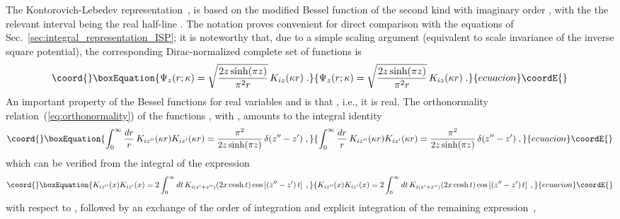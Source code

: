 \documentclass[a4paper,preprint,draft,showpacs,amsmath,amsfonts,amssymb,aps,prd]{revtex4}%
\begin{document}
The Kontorovich-Lebedev representation~\cite{kontorovich},
is based on the modified Bessel function
of the second kind with imaginary order
\coordHE{}, with the 
the relevant interval being the real half-line
\myHighlight{${\mathcal I} = [0,\infty)$}\coordHE{}.
The notation
\coordHE{}
proves convenient  for direct comparison with the equations of 
Sec.~\ref{sec:integral_representation_ISP}; it is noteworthy that, due to a simple
scaling argument (equivalent to scale
invariance of the inverse square potential), 
the corresponding Dirac-normalized complete set of functions
is
\begin{equation}\coord{}\boxEquation{
\Psi_{z} (r;\kappa)
=
\sqrt{  \frac{ 2 z \sinh ( \pi z )  }{ \pi^{2} r }  }
\,
K_{iz} (\kappa r) 
\;   .
}{
\Psi_{z} (r;\kappa)
=
\sqrt{  \frac{ 2 z \sinh ( \pi z )  }{ \pi^{2} r }  }
\,
K_{iz} (\kappa r) 
\;   .
}{ecuacion}\coordE{}\end{equation}
An important property of the Bessel functions \coordHE{} for real variables
\coordHE{} and \coordHE{} is that
\coordHE{},
i.e., it is real.
The orthonormality relation~(\ref{eq:orthonormality})
of the functions \coordHE{}, with \myHighlight{${\mathcal J} =[0,\infty)$}\coordHE{},
amounts to the integral identity
\begin{equation}\coord{}\boxEquation{
\int_{0}^{\infty}
\frac{dr}{r}
\,
K_{iz''} (\kappa r) 
K_{iz'} (\kappa r) 
=
\frac{ \pi^{2}  }{ 2 z \sinh ( \pi z )  }
\,
\delta (z''-z')
\;  ,
\label{eq:orthonormality_KL}
}{
\int_{0}^{\infty}
\frac{dr}{r}
\,
K_{iz''} (\kappa r) 
K_{iz'} (\kappa r) 
=
\frac{ \pi^{2}  }{ 2 z \sinh ( \pi z )  }
\,
\delta (z''-z')
\;  ,
}{ecuacion}\coordE{}\end{equation}
which can be verified
from the integral of the expression~\cite{wat:44b}
\begin{equation}\coord{}\boxEquation{
K_{iz''} (x) 
K_{iz'} (x) 
=
2 
\int_{0}^{\infty}
dt 
\,
K_{i(z'+z'')} (2x \cosh t) 
\cos \left[ 
\left( z''-z'
\right) t
\right]
\;  ,
\label{eq:orthonormality_KL_aux}
}{
K_{iz''} (x) 
K_{iz'} (x) 
=
2 
\int_{0}^{\infty}
dt 
\,
K_{i(z'+z'')} (2x \cosh t) 
\cos \left[ 
\left( z''-z'
\right) t
\right]
\;  ,
}{ecuacion}\coordE{}\end{equation}
with respect to \coordHE{},
followed by an exchange of the order of integration
and explicit integration of the remaining expression~\cite{gra:00},
\end{document}
